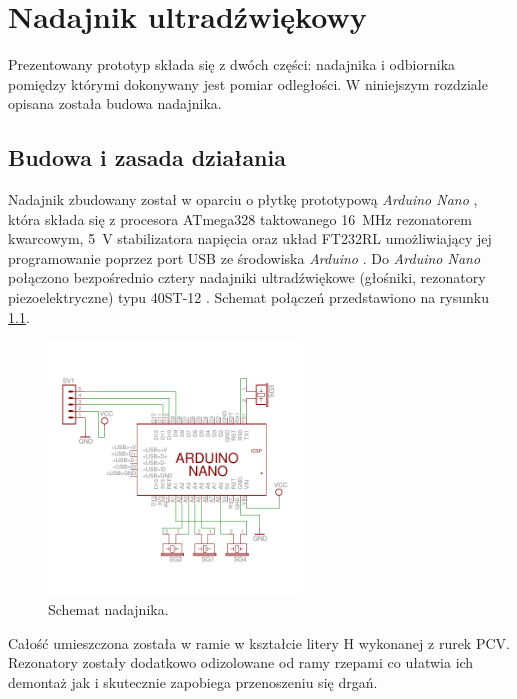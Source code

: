 \chapter{Nadajnik ultradźwiękowy}

Prezentowany prototyp składa się z dwóch części: nadajnika i odbiornika pomiędzy którymi
dokonywany jest pomiar odległości. W niniejszym rozdziale opisana została budowa nadajnika. 

\section{Budowa i zasada działania}

Nadajnik zbudowany został w oparciu o płytkę prototypową \textit{Arduino Nano} \cite{bib:arduinoNano},
która składa się z procesora ATmega328 \cite{bib:atmega328} taktowanego \SI{16}{MHz} rezonatorem kwarcowym,
\SI{5}{V} stabilizatora napięcia oraz układ FT232RL umożliwiający 
jej programowanie poprzez port USB ze środowiska \textit{Arduino} \cite{bib:Arduino}. 
Do \textit{Arduino Nano} połączono 
bezpośrednio cztery nadajniki ultradźwiękowe (głośniki, rezonatory piezoelektryczne) typu 40ST-12 \cite{bib:40ST12}.
Schemat połączeń przedstawiono na rysunku \ref{fig:nadajnik_schemat}.

 \begin{figure}[ht!]
    \centering
    \includegraphics[width=0.6\textwidth, trim= 0mm 0mm 0mm 0mm,clip]{transmitter}
    \caption{Schemat nadajnika.}
    \label{fig:nadajnik_schemat}
\end{figure}

Całość umieszczona została w ramie w kształcie litery H wykonanej z rurek PCV.
Rezonatory zostały dodatkowo odizolowane od ramy rzepami co ułatwia ich demontaż jak i skutecznie
zapobiega przenoszeniu się drgań. 

